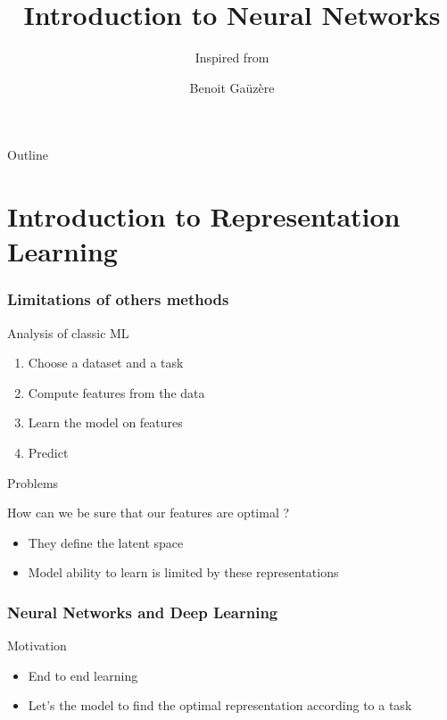 \documentclass[11pt]{beamer}
\title{Introduction to Neural Networks}
\subtitle{ Inspired from \cite{raschka2022machine, chollet2021deep,
    geron2022hands}}
\author{Benoit Gaüzère}
\institute{INSA Rouen Normandie - Laboratoire LITIS}
\begin{document}
\maketitle


\begin{frame}{Outline}
  \tableofcontents
\end{frame}

\section{Introduction to Representation Learning}
\label{sec:intro}

\begin{frame}
  \frametitle{Limitations of others methods}
  \begin{block}{Analysis of classic ML}
    \begin{enumerate}
    \item Choose a dataset and a task
    \item Compute features from the data
    \item Learn the model on features
    \item Predict
    \end{enumerate}
  \end{block}

  \begin{block}{Problems}
    \begin{center}
      How can we be sure that our features are optimal ?
    \end{center}
    \begin{itemize}
    \item They define the latent space
    \item Model ability to learn is limited by these representations
    \end{itemize}
  \end{block}
  
\end{frame}

\begin{frame}
  \frametitle{Neural Networks and Deep Learning}
  \begin{block}{Motivation}
    \begin{itemize}
    \item End to end learning
    \item Let's the model to find the optimal representation according to a task
    \end{itemize}
  \end{block}
\begin{center}


\end{center}
\end{frame}
\end{document}
